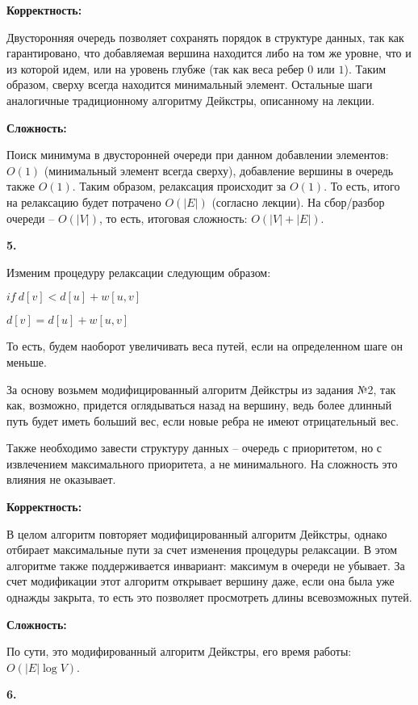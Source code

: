 \documentclass[12pt]{extreport}
\begin{document}
\bigskip 
{\bf Корректность:}

Двусторонняя очередь позволяет сохранять порядок в структуре данных, так как гарантировано, что добавляемая вершина находится либо на том же уровне, что и из которой идем, или на уровень глубже (так как веса ребер $0 $ или $1$). Таким образом, сверху всегда находится минимальный элемент. 
Остальные шаги аналогичные традиционному алгоритму Дейкстры, описанному на лекции.

\bigskip 
{\bf Сложность:} 

Поиск минимума в двусторонней очереди при данном добавлении элементов: $O(1)$ (минимальный элемент всегда сверху), добавление вершины в очередь также $O(1)$. Таким образом, релаксация происходит за $O(1)$. То есть, итого на релаксацию будет потрачено $O(|E|)$ (согласно лекции). На сбор/разбор очереди -- $O(|V|)$, то есть, итоговая сложность: $O(|V|+|E|)$.

\bigskip 
{\bf 5.} 

Изменим процедуру релаксации следующим образом: 

$if \: d[v] < d[u] + w[u,v]$

\hspace{20pt} $d[v] = d[u] + w[u,v]$

То есть, будем наоборот увеличивать веса путей, если на определенном шаге он меньше. 

За основу возьмем модифицированный алгоритм Дейкстры из задания №2, так как, возможно, придется оглядываться назад на вершину, ведь более длинный путь будет иметь больший вес, если новые ребра не имеют отрицательный вес.

Также необходимо завести структуру данных -- очередь с приоритетом, но с извлечением максимального приоритета, а не минимального. На сложность это влияния не оказывает. 

\bigskip 
{\bf Корректность:}

В целом алгоритм повторяет модифицированный алгоритм Дейкстры, однако отбирает максимальные пути за счет изменения процедуры релаксации. В этом алгоритме также поддерживается инвариант: максимум в очереди не убывает. За счет модификации этот алгоритм открывает вершину даже, если она была уже однажды закрыта, то есть это позволяет просмотреть длины всевозможных путей. 

\bigskip 
{\bf Сложность:} 

По сути, это модифированный алгоритм Дейкстры, его время работы: $O(|E| \log V)$.

\bigskip 
{\bf 6.} 
\end{document}
